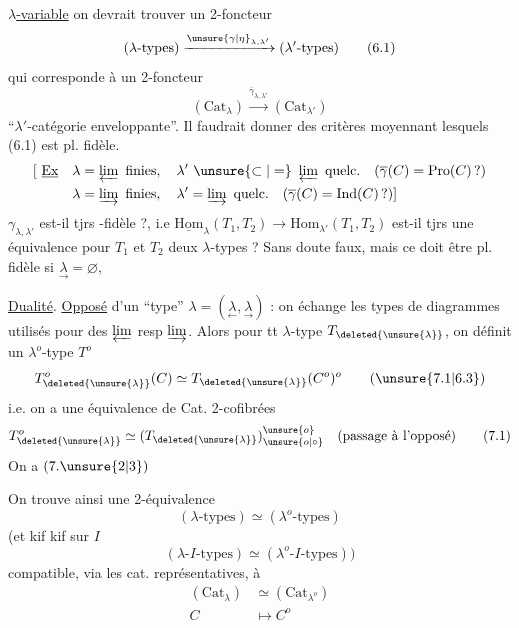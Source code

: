  \uline{$\lambda$-variable} on devrait trouver  un 2-foncteur
\[
(\lambda\text{-types})\xrightarrow{\unsure{\gamma|\eta}_{\lambda,\lambda'}}(\lambda'\text{-types})\tag*{(6.1)}
\]
qui corresponde à un 2-foncteur
\[
(\mathrm{Cat}_{\lambda})\xrightarrow{\overline\gamma_{\lambda,\lambda'}}(\mathrm{Cat}_{\lambda'})\tag*{(6.2)}
\]
``$\lambda'$-catégorie enveloppante''. Il faudrait donner des
critères moyennant lesquels (6.1) est pl. fidèle.
\[
\begin{aligned}
[\ \underline{\text{Ex}}\quad\lambda&=\varprojlim\text{ finies},\quad\lambda'\ \unsure{\subset|=}\ \varprojlim\text{ quelc.}\quad(\overline\gamma(C)=\mathrm{Pro}(C)\,?)\\
\lambda&=\varinjlim\text{ finies},\quad\lambda'=\varinjlim\text{ quelc.}\quad(\overline\gamma(C)=\mathrm{Ind}(C)\,?)]
\end{aligned}
\]
 $\gamma_{\lambda,\lambda'}$ est-il tjrs -fidèle ?, i.e
$\underline{\mathrm{Hom}}_\lambda(T_1,T_2)\longrightarrow\mathrm{Hom}_{\lambda'}(T_1,T_2)$
est-il tjrs une équivalence pour $T_1$ et $T_2$ deux $\lambda$-types ? Sans
doute faux, mais ce doit être pl. fidèle si $\underset{\rightarrow}{\lambda}=\varnothing$,

 \uline{Dualité}. \uline{Opposé} d'un ``type'' $\lambda=(\underset{\leftarrow}{\lambda},\underset{\rightarrow}{\lambda})$ : on échange
les types de diagrammes utilisés pour des $\varprojlim$ resp $\varinjlim$.
Alors pour tt $\lambda$-type $T_{\deleted{\unsure{\lambda}}}$, on définit un $\lambda^o$-type $T^o$ 
\[
T^o_{\deleted{\unsure{\lambda}}}(C)\simeq T_{\deleted{\unsure{\lambda}}}(C^o)^o\tag*{(\unsure{7.1|6.3})}
\]
i.e. on a une équivalence de Cat. 2-cofibrées
\[
T_{\deleted{\unsure{\lambda}}}^{o}\simeq(T_{\deleted{\unsure{\lambda}}})_{\unsure{o|\circ}}^{\unsure{o}}\quad\text{(passage à l'opposé)}\tag*{(7.1)}
\]
On a $(7.\unsure{2|3})$ \unsure{!}

On trouve ainsi une 2-équivalence
\[
(\lambda\text{-types})\simeq(\lambda^o\text{-types})\tag*{(7.3)}
\]
(et kif kif sur $I$
\[
(\lambda\text{-}I\text{-types})\simeq(\lambda^o\text{-}I\text{-types}))\tag*{(7.4.)}
\]
compatible, via les cat. représentatives, à
\[
\begin{aligned}
(\mathrm{Cat}_\lambda)&\simeq(\mathrm{Cat}_{\lambda^o})\\
C&\longmapsto C^o
\end{aligned}\tag*{(7.6)}
\]


